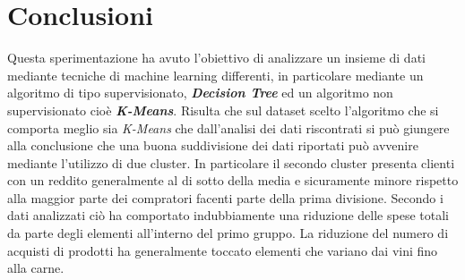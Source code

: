 \documentclass[letterpaper,11pt]{article}
\newcommand\blankpage{%
    \null
    \thispagestyle{empty}%
    \addtocounter{page}{-1}%
    \newpage}
\begin{document}
\blankpage


\section*{Conclusioni}

Questa sperimentazione ha avuto l'obiettivo di analizzare un insieme di dati mediante tecniche di machine learning differenti, in particolare mediante un algoritmo di tipo supervisionato, \textit{\textbf{Decision Tree}} ed un algoritmo non supervisionato cioè  \textit{\textbf{K-Means}}. Risulta che sul dataset scelto l'algoritmo che si comporta meglio sia \textit{K-Means} che dall'analisi dei dati riscontrati si può giungere alla conclusione che una buona suddivisione dei dati riportati può avvenire mediante l'utilizzo di due cluster. In particolare il secondo cluster presenta clienti con un reddito generalmente al di sotto della media e sicuramente minore rispetto alla maggior parte dei compratori facenti parte della prima divisione. Secondo i dati analizzati ciò ha comportato indubbiamente una riduzione delle spese totali da parte degli elementi all'interno del primo gruppo. La riduzione del numero di acquisti di prodotti ha generalmente toccato elementi che variano dai vini fino alla carne. 
\end{document}

